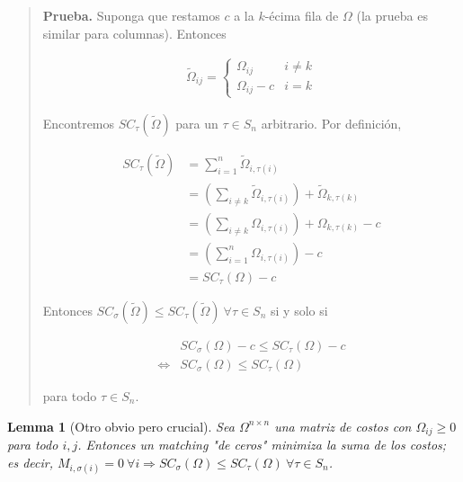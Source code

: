 \documentclass[a4paper]{article}
\newtheorem{lemma}{Lemma}
\newtheorem{lemma}{Lemma}
\begin{document}
\small
\begin{quote}

\textbf{Prueba.} Suponga que restamos $c$ a la $k$-écima fila de $\Omega$ (la prueba 
es similar para columnas). Entonces 

\begin{align*}
    \widetilde{ \Omega }_{ij}  = \begin{cases}
        \Omega_{ij} & i \neq k \\ 
        \Omega_{ij} - c & i = k
    \end{cases}
\end{align*}

Encontremos $SC_{\tau}(\widetilde{ \Omega }) $ para un $\tau \in S_n$ arbitrario. Por definición, 

\begin{align*}
    SC_{\tau}(\widetilde{ \Omega } ) &= \sum_{i=1}^{n} \widetilde{ \Omega }_{i, \tau(i)} \\ 
                                     &= \left( \sum_{i \neq k} \widetilde{ \Omega }_{i, \tau(i)}  \right)  + \widetilde{ \Omega }_{k, \tau(k)} \\ 
                                     &= \left( \sum_{i \neq k } \Omega_{i, \tau(i)} \right)  + \Omega_{k, \tau(k)} - c \\ 
                                     &= \left(\sum_{i=1}^{n} \Omega_{i, \tau(i)}\right) - c \\ 
                                     &= SC_{\tau}(\Omega) - c
\end{align*}

Entonces $SC_{\sigma}(\widetilde{ \Omega }) \leq SC_{\tau} (\widetilde{ \Omega } ) ~ \forall \tau \in S_n $  si y solo si 

\begin{align*}
    &SC_{\sigma}(\Omega) - c \leq SC_{\tau}(\Omega) - c \\ 
    \iff & SC_{\sigma}(\Omega) \leq SC_{\tau}(\Omega) 
\end{align*}

para todo $\tau \in S_n$.

\end{quote}
\normalsize


\begin{lemma}[Otro obvio pero crucial] 
    Sea $\Omega^{n \times n}$ una matriz de costos con $\Omega_{ij} \geq 0$ para todo $i, j$.
    Entonces un matching "de ceros" minimiza la suma de los costos; 
    es decir, $M_{i, \sigma(i)} = 0 ~ \forall  i \Rightarrow SC_{\sigma}(\Omega) \leq SC_{\tau}(\Omega) ~ \forall \tau \in S_n$.
\end{lemma}
\end{document}

